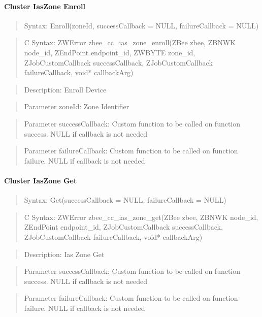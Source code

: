 \paragraph{Cluster IasZone Enroll}
\begin{quote}Syntax: Enroll(zoneId, successCallback = NULL, failureCallback = NULL)\end{quote}
\begin{quote}C Syntax: ZWError zbee\_cc\_ias\_zone\_enroll(ZBee zbee, ZBNWK node\_id, ZEndPoint endpoint\_id, ZWBYTE zone\_id, ZJobCustomCallback successCallback, ZJobCustomCallback failureCallback, void* callbackArg)\end{quote}
\begin{quote}Description: Enroll Device\end{quote}
\begin{quote}Parameter zoneId: Zone Identifier\end{quote}
\begin{quote}Parameter successCallback: Custom function to be called on function success. NULL if callback is not needed\end{quote}
\begin{quote}Parameter failureCallback: Custom function to be called on function failure. NULL if callback is not needed\end{quote}


\paragraph{Cluster IasZone Get}
\begin{quote}Syntax: Get(successCallback = NULL, failureCallback = NULL)\end{quote}
\begin{quote}C Syntax: ZWError zbee\_cc\_ias\_zone\_get(ZBee zbee, ZBNWK node\_id, ZEndPoint endpoint\_id, ZJobCustomCallback successCallback, ZJobCustomCallback failureCallback, void* callbackArg)\end{quote}
\begin{quote}Description: Ias Zone Get\end{quote}
\begin{quote}Parameter successCallback: Custom function to be called on function success. NULL if callback is not needed\end{quote}
\begin{quote}Parameter failureCallback: Custom function to be called on function failure. NULL if callback is not needed\end{quote}


